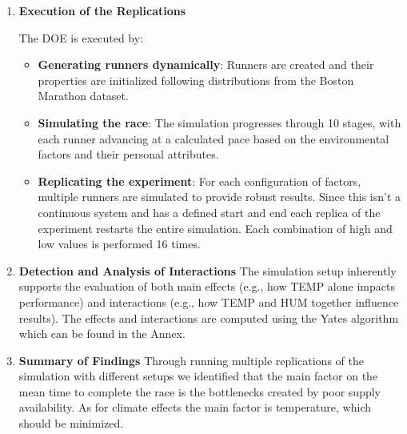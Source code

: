\documentclass[conference]{IEEEtran}
\begin{document}
\begin{enumerate}
    \item \textbf{Execution of the Replications}
    
    The DOE is executed by:
    \begin{itemize}
        \item \textbf{Generating runners dynamically}: Runners are created and their properties are initialized following distributions from the Boston Marathon dataset.
        \item \textbf{Simulating the race}: The simulation progresses through 10 stages, with each runner advancing at a calculated pace based on the environmental factors and their personal attributes.
        \item \textbf{Replicating the experiment}: For each configuration of factors, multiple runners are simulated to provide robust results. Since this isn't a continuous system and has a defined start and end each replica of the experiment restarts the entire simulation. Each combination of high and low values is performed 16 times.
    \end{itemize}

    \item \textbf{Detection and Analysis of Interactions}
    The simulation setup inherently supports the evaluation of both main effects (e.g., how TEMP alone impacts performance) and interactions (e.g., how TEMP and HUM together influence results). The effects and interactions are computed using the Yates algorithm which can be found in the Annex.
    \item \textbf{Summary of Findings}
    Through running multiple replications of the simulation with different setups we identified that the main factor on the mean time to complete the race is the bottlenecks created by poor supply availability. As for climate effects the main factor is temperature, which should be minimized.
\end{enumerate}
\end{document}
